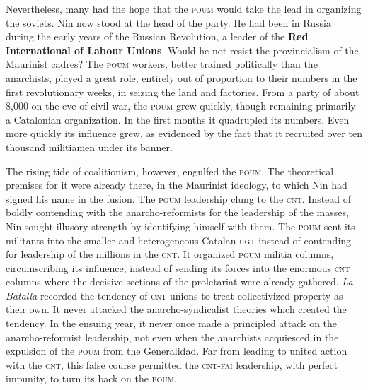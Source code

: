 Nevertheless, many had the hope that the \textsc{poum} would take the lead in organizing the soviets. Nin now stood at the head of the party. He had been in Russia during the early years of the Russian Revolution, a leader of the \textbf{Red International of Labour Unions}. Would he not resist the provincialism of the Maurinist cadres? The \textsc{poum} workers, better trained politically than the anarchists, played a great role, entirely out of proportion to their numbers in the first revolutionary weeks, in seizing the land and factories. From a party of about 8,000 on the eve of civil war, the \textsc{poum} grew quickly, though remaining primarily a Catalonian organization. In the first months it quadrupled its numbers. Even more quickly its influence grew, as evidenced by the fact that it recruited over ten thousand militiamen under its banner.

The rising tide of coalitionism, however, engulfed the \textsc{poum}. The theoretical premises for it were already there, in the Maurinist ideology, to which Nin had signed his name in the fusion. The \textsc{poum} leadership clung to the \textsc{cnt}. Instead of boldly contending with the anarcho-reformists for the leadership of the masses, Nin sought illusory strength by identifying himself with them. The \textsc{poum} sent its militants into the smaller and heterogeneous Catalan \textsc{ugt} instead of contending for leadership of the millions in the \textsc{cnt}. It organized \textsc{poum} militia columns, circumscribing its influence, instead of sending its forces into the enormous \textsc{cnt} columns where the decisive sections of the proletariat were already gathered. \emph{La Batalla} recorded the tendency of \textsc{cnt} unions to treat collectivized property as their own. It never attacked the anarcho-syndicalist theories which created the tendency. In the ensuing year, it never once made a principled attack on the anarcho-reformist leadership, not even when the anarchists acquiesced in the expulsion of the \textsc{poum} from the Generalidad. Far from leading to united action with the \textsc{cnt}, this false course permitted the \textsc{cnt-fai} leadership, with perfect impunity, to turn its back on the \textsc{poum}.

